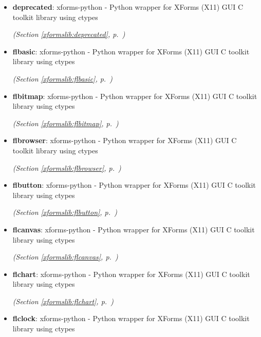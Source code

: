 \begin{itemize}
\setlength{\parskip}{0ex}
\item \textbf{deprecated}: xforms-python - Python wrapper for XForms (X11) GUI C toolkit library using
ctypes



  \textit{(Section \ref{xformslib:deprecated}, p.~\pageref{xformslib:deprecated})}

\item \textbf{flbasic}: xforms-python - Python wrapper for XForms (X11) GUI C toolkit library using
ctypes



  \textit{(Section \ref{xformslib:flbasic}, p.~\pageref{xformslib:flbasic})}

\item \textbf{flbitmap}: xforms-python - Python wrapper for XForms (X11) GUI C toolkit library using
ctypes



  \textit{(Section \ref{xformslib:flbitmap}, p.~\pageref{xformslib:flbitmap})}

\item \textbf{flbrowser}: xforms-python - Python wrapper for XForms (X11) GUI C toolkit library using
ctypes



  \textit{(Section \ref{xformslib:flbrowser}, p.~\pageref{xformslib:flbrowser})}

\item \textbf{flbutton}: xforms-python - Python wrapper for XForms (X11) GUI C toolkit library using
ctypes



  \textit{(Section \ref{xformslib:flbutton}, p.~\pageref{xformslib:flbutton})}

\item \textbf{flcanvas}: xforms-python - Python wrapper for XForms (X11) GUI C toolkit library using
ctypes



  \textit{(Section \ref{xformslib:flcanvas}, p.~\pageref{xformslib:flcanvas})}

\item \textbf{flchart}: xforms-python - Python wrapper for XForms (X11) GUI C toolkit library using
ctypes



  \textit{(Section \ref{xformslib:flchart}, p.~\pageref{xformslib:flchart})}

\item \textbf{flclock}: xforms-python - Python wrapper for XForms (X11) GUI C toolkit library using
ctypes




\end{itemize}
